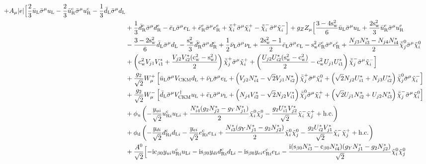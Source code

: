 \documentclass[CheatSheet]{subfiles}
\begin{document}
\begin{equation}
\begin{split}
+
A_\mu|e|\Bigl[
   \frac{2}{3} {\buL\bsigma^{\mu }\uL}
  -\frac{2}{3} {\buR^{\cc}\bsigma^{\mu }\uR^{\cc}}
  -\frac{1}{3} {\bdL\bsigma^{\mu }\dL}
\\&
  +\frac13 \bdR^{\cc}\bsigma^{\mu }\dR^{\cc}
  - {\beL\bsigma^{\mu }\eL}
  +{\beR^{\cc }\bsigma^{\mu }\eR^{\cc }}
  + \bcharP[i]\bsigma^{\mu}\charP[i]
  -\bcharM[i]\bsigma^{\mu}\charM[i]
\Bigr]
%
+g_Z Z_\mu\Bigl[
  \frac{3-4\sw^2}{6} {\buL\bsigma^{\mu }\uL}
  +\frac{2\sw^2}{3} {\buR^{\cc}\bsigma^{\mu }\uR^{\cc}}
  \\&
  -\frac{3-2\sw^2}{6} {\bdL\bsigma^{\mu }\dL}
  -\frac{\sw^2}{3} {\bdR^{\cc}\bsigma^{\mu }\dR^{\cc}}
  +\frac{1}{2} {\bnuL\bsigma^{\mu }\nuL}
  +\frac{2\sw^2-1}{2} {\beL\bsigma^{\mu }\eL}
  - \sw^2{\beR^{\cc }\bsigma^{\mu }\eR^{\cc }}
  + \frac{N_{j3} N_{i3}^*-N_{j4} N_{i4}^*}{2} \bneut[j]\bsigma^{\mu }\neut[i]
  \\&
  + \left(\cw^2 V_{j1} V_{i1}^*+\frac{V_{j2} V_{i2}^* (\cw^2-\sw^2)}{2}\right) \bcharP[j]\bsigma^{\mu}\charP[i]
  + \left(\frac{U_{j2} U_{i2}^* (\sw^2-\cw^2)}{2}-\cw^2 U_{j1} U_{i1}^*\right){\bcharM[j]\bsigma^{\mu }\charM[i]}
\Bigr]
\\&+\frac{g_2}{\sqrt2}W_\mu^+\left[
    \buL\bsigma^{\mu }V\w{CKM}\dL
    +\bnuL\bsigma^{\mu }\eL
    + \left({V_{j2} N_{i4}^*}-\sqrt{2}V_{j1} N_{i2}^*\right) \bcharP[j]\bsigma^{\mu }\neut[i]
    +\left(\sqrt2 N_{j2} U_{i1}^*+N_{j3} U_{i2}^*\right)\bneut[j]\bsigma^{\mu }\charM[i]
\right]
\\&+\frac{g_2}{\sqrt2}W_\mu^-\left[
    \bdL\bsigma^{\mu }V\w{CKM}^\dagger \uL
    +\beL\bsigma^{\mu }\nuL
    +\left(N_{j4} V_{i2}^*-\sqrt2 N_{j2} V_{i1}^*\right)\bneut[j]\bsigma^{\mu }\charP[i]
    +\left(\sqrt{2}U_{j1} N_{i2}^*+{U_{j2} N_{i3}^*}\right) \bcharM[j]\bsigma^{\mu }\neut[i]
\right]
\\&
+\phi\w u\left(
-\frac{\yu[i]}{\sqrt2 }\uR[i]^{\cc}\uL[i]
+\frac{N_{i4}^* (g_2 N_{j2}^*-g_Y N_{j1}^*)}{2} {\neut[i]\neut[j]}
-\frac{g_2  U_{i1}^* V_{j2}^*}{\sqrt{2}} \charM[i]\charP[j]
+\text{h.c.}
\right)
%
\\&
+\phi\w d\left(
-\frac{\yd[i]}{\sqrt2} \dR[i]^{\cc}\dL[i]
-\frac{\ye[i]}{\sqrt2} \eR[i]^{\cc}\eL[i]
+\frac{N_{i3}^* (g_Y N_{j1}^*-g_2 N_{j2}^*)}{2} \neut[i]\neut[j]
-\frac{g_2  U_{i2}^* V_{j1}^*}{\sqrt{2}}\charM[i]\charP[j]
+\text{h.c.}
\right)
\\&+\frac{A^0}{\sqrt2}\Bigl[
-\ii\co{\beta0}{\yu[i]\uR[i]^{\cc}\uL[i]}
-\ii\si{\beta0}{\yd[i]\dR[i]^{\cc}\dL[i]}
-\ii\si{\beta0}{\ye[i]\eR[i]^{\cc}\eL[i]}
-\frac{\ii(\si{\beta0} N_{i3}^*-\co{\beta0} N_{i4}^*) (g_Y N_{j1}^*-g_2 N_{j2}^*)}{\sqrt2} {\neut[i]\neut[j]}

\end{split}
\end{equation}
\end{document}
